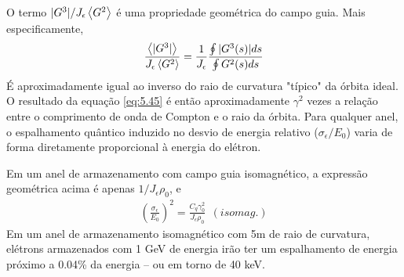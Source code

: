 O termo $|G^3|/J_\epsilon \left< G^2 \right>$ é uma propriedade geométrica do campo guia. Mais especificamente,
\begin{align}
	\frac{\left< |G^3| \right>}{J_\epsilon\left< G^2 \right>} = \frac{1}{J_\epsilon}\frac{\oint |G^3(s)|ds}{\oint G^2(s)ds}
\end{align}
É aproximadamente igual ao inverso do raio de curvatura "típico" da órbita ideal. O resultado da equação \eqref{eq:5.45} é então aproximadamente $\gamma^2$ vezes a relação entre o comprimento de onda de Compton e o raio da órbita. Para qualquer anel, o espalhamento quântico induzido no desvio de energia relativo ($\sigma_\epsilon/E_0$) varia de forma diretamente proporcional à energia do elétron.

Em um anel de armazenamento com campo guia isomagnético, a expressão geométrica acima é apenas $1/J_\epsilon \rho_0$, e
\begin{align}
	\left(\frac{\sigma_\epsilon}{E_0}\right)^2 = \frac{C_q \gamma_0^2}{J_\epsilon \rho_0}\ \ (isomag.)
\end{align}
Em um anel de armazenamento isomagnético com 5m de raio de curvatura, elétrons armazenados com 1 GeV de energia irão ter um espalhamento de energia próximo a 0.04\% da energia -- ou em torno de 40 keV.